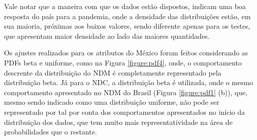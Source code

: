 \documentclass[a4paper,12pt]{article}
\begin{document}
\par Vale notar que a maneira com que os dados estão dispostos, indicam uma boa resposta do país para a pandemia, onde a densidade das distribuições estão, em sua maioria, próximas aos baixos valores, sendo diferente apenas para os testes, que apresentam maior densidade ao lado das maiores quantidades.

\par Os ajustes realizados para os atributos do México foram feitos considerando as PDFs beta e uniforme, como na Figura \ref{figure:pdf4}, onde, o comportamento descrente da distribuição do NDM é completamente representado pela distribuição beta. Já para o NDC, a distribuição beta é utilizada, onde o mesmo comportamento apresentado no NDM do Brasil (Figura \ref{figure:pdf1} (b)), que, mesmo sendo indicado como uma distribuição uniforme, não pode ser representado por tal por conta dos comportamentos apresentados no início da distribuição dos dados, que tem muito mais representatividade na área de probabilidades que o restante.
\end{document}
